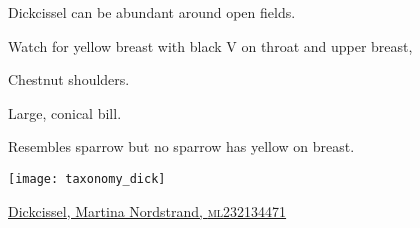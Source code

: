 \documentclass[t]{beamer}
\newcommand{\backoneline}{\vspace{-\baselineskip}}
\begin{document}
\begin{frame}{Dickcissel can be abundant around open fields.}
	
	\backoneline
	
	\begin{multicols}{2}
		Watch for yellow breast with black V on throat and upper breast,
		
		\smallskip
		
		Chestnut shoulders.
		
		\smallskip
		
		Large, conical bill.
		
		\smallskip
		
		Resembles sparrow but no sparrow has yellow on breast.
		
		\columnbreak
		
		\texttt{[image: taxonomy\_dick]}
		
	\end{multicols}

	\tinyfill \href{https://macaulaylibrary.org/asset/232134471}{Dickcissel, Martina Nordstrand, \textsc{ml}232134471} 	
\end{frame}
\end{document}
